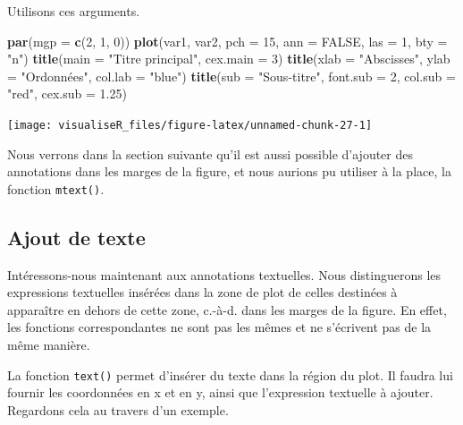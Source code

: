 \documentclass[]{article}
\newenvironment{Shaded}{\begin{snugshade}}{\end{snugshade}}
\newcommand{\DataTypeTok}[1]{\textcolor[rgb]{0.13,0.29,0.53}{#1}}
\newcommand{\DecValTok}[1]{\textcolor[rgb]{0.00,0.00,0.81}{#1}}
\newcommand{\FloatTok}[1]{\textcolor[rgb]{0.00,0.00,0.81}{#1}}
\newcommand{\KeywordTok}[1]{\textcolor[rgb]{0.13,0.29,0.53}{\textbf{#1}}}
\newcommand{\NormalTok}[1]{#1}
\newcommand{\OtherTok}[1]{\textcolor[rgb]{0.56,0.35,0.01}{#1}}
\newcommand{\StringTok}[1]{\textcolor[rgb]{0.31,0.60,0.02}{#1}}
\begin{document}
Utilisons ces arguments.

\begin{Shaded}
\begin{Highlighting}[]
\KeywordTok{par}\NormalTok{(}\DataTypeTok{mgp =} \KeywordTok{c}\NormalTok{(}\DecValTok{2}\NormalTok{, }\DecValTok{1}\NormalTok{, }\DecValTok{0}\NormalTok{))}
\KeywordTok{plot}\NormalTok{(var1, var2, }\DataTypeTok{pch =} \DecValTok{15}\NormalTok{, }\DataTypeTok{ann =} \OtherTok{FALSE}\NormalTok{, }\DataTypeTok{las =} \DecValTok{1}\NormalTok{, }\DataTypeTok{bty =} \StringTok{"n"}\NormalTok{)}
\KeywordTok{title}\NormalTok{(}\DataTypeTok{main =} \StringTok{"Titre principal"}\NormalTok{, }\DataTypeTok{cex.main =} \DecValTok{3}\NormalTok{)}
\KeywordTok{title}\NormalTok{(}\DataTypeTok{xlab =} \StringTok{"Abscisses"}\NormalTok{, }\DataTypeTok{ylab =} \StringTok{"Ordonnées"}\NormalTok{, }\DataTypeTok{col.lab =} \StringTok{"blue"}\NormalTok{)}
\KeywordTok{title}\NormalTok{(}\DataTypeTok{sub =} \StringTok{"Sous-titre"}\NormalTok{, }\DataTypeTok{font.sub =} \DecValTok{2}\NormalTok{, }\DataTypeTok{col.sub =} \StringTok{"red"}\NormalTok{, }\DataTypeTok{cex.sub =} \FloatTok{1.25}\NormalTok{)}
\end{Highlighting}
\end{Shaded}

\begin{center}\texttt{[image: visualiseR\_files/figure-latex/unnamed-chunk-27-1]} \end{center}

Nous verrons dans la section suivante qu'il est aussi possible d'ajouter des annotations dans les marges de la figure, et nous aurions pu utiliser à la place, la fonction \texttt{mtext()}.

\hypertarget{ajout-de-texte}{%
\subsection{Ajout de texte}\label{ajout-de-texte}}

Intéressons-nous maintenant aux annotations textuelles. Nous distinguerons les expressions textuelles insérées dans la zone de plot de celles destinées à apparaître en dehors de cette zone, c.-à-d. dans les marges de la figure. En effet, les fonctions correspondantes ne sont pas les mêmes et ne s'écrivent pas de la même manière.

La fonction \texttt{text()} permet d'insérer du texte dans la région du plot. Il faudra lui fournir les coordonnées en x et en y, ainsi que l'expression textuelle à ajouter. Regardons cela au travers d'un exemple.
\end{document}
